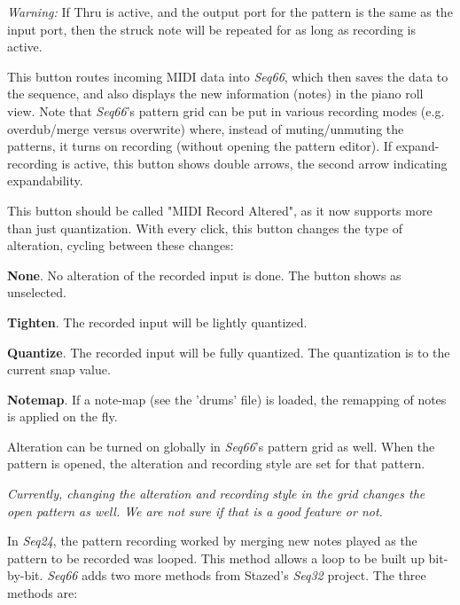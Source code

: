   \textsl{Warning:}
   If Thru is active, and the output port for the pattern is the
   same as the input port, then the struck note will be repeated
   for as long as recording is active.

   This button routes incoming MIDI data into
   \textsl{Seq66}, which then saves the data to the sequence, and also
   displays the new information (notes) in the piano roll view.
   Note that \textsl{Seq66}'s pattern grid can be put in various recording
   modes (e.g. overdub/merge versus overwrite) where, instead of
   muting/unmuting the patterns, it turns on recording (without opening the
   pattern editor).
   If expand-recording is active, this button shows double arrows, the
   second arrow indicating expandability.

   This button should be called "MIDI Record Altered", as it now supports
   more than just quantization.
   With every click, this button changes the type of alteration, cycling
   between these changes:

   \begin{enumber}
      \item \textbf{None}.
         No alteration of the recorded input is done.
         The button shows as unselected.
      \item \textbf{Tighten}.
         The recorded input will be lightly quantized.
      \item \textbf{Quantize}.
         The recorded input will be fully quantized.
         The quantization is to the current snap value.
      \item \textbf{Notemap}.
         If a note-map (see the 'drums' file) is loaded, the remapping of notes
         is applied on the fly.
   \end{enumber}

   Alteration can be turned on globally in \textsl{Seq66}'s pattern grid
   as well.
   When the pattern is opened, the alteration and recording style are
   set for that pattern.

   \textsl{Currently, changing the alteration and recording style in the grid
   changes the open pattern as well.  We are not sure if that is a good feature
   or not.}

   In \textsl{Seq24}, the pattern recording worked by merging new notes played
   as the pattern to be recorded was looped.  This method allows a loop to be
   built up bit-by-bit.  \textsl{Seq66} adds two more methods from
   Stazed's \textsl{Seq32} project.  The three methods are:

